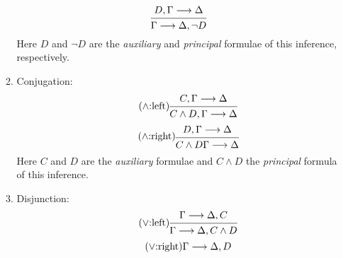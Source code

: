 \documentclass[11pt,a4paper]{article}
\begin{document}
\begin{definition}
\begin{enumerate}
\begin{enumerate}
\begin{equation}
                    \label{eq:lnot:right}
                    \begin{prooftree}
                        \hypo{D, \Gamma\seq\Delta}
                        \infer1{\Gamma\seq\Delta, \lnot D}
                    \end{prooftree}
                \end{equation}
                Here \(D\) and \(\lnot D\) are the \emph{auxiliary} and \emph{principal} formulae
                of this inference, respectively.
            \item\label{it:conjugation} Conjugation:
                \begin{equation}
                    \tag{\(\land\):left}
                    \label{eq:land:left}
                    \begin{prooftree}
                        \hypo{C, \Gamma\seq\Delta}
                        \infer1{C\land D, \Gamma\seq\Delta}
                    \end{prooftree}
                \end{equation}
                \begin{equation}
                    \tag{\(\land\):right}
                    \label{eq:land:right}
                    \begin{prooftree}
                        \hypo{D, \Gamma\seq\Delta}
                        \infer1{C\land D\Gamma\seq\Delta}
                    \end{prooftree}
                \end{equation}
                Here \(C\) and \(D\) are the \emph{auxiliary} formulae and \(C\land D\) the \emph{principal} formula
                of this inference.
            \item\label{it:disjunction} Disjunction:
                \begin{equation}
                    \tag{\(\lor\):left}
                    \label{eq:lor:left}
                    \begin{prooftree}
                        \hypo{\Gamma\seq\Delta, C}
                        \infer1{\Gamma\seq\Delta, C\land D}
                    \end{prooftree}
                \end{equation}
                \begin{equation}
                    \tag{\(\lor\):right}
                    \label{eq:lor:right}
                    \begin{prooftree}
                        \hypo{\Gamma\seq\Delta, D}

\end{prooftree}
\end{equation}
\end{enumerate}
\end{enumerate}
\end{definition}
\end{document}
